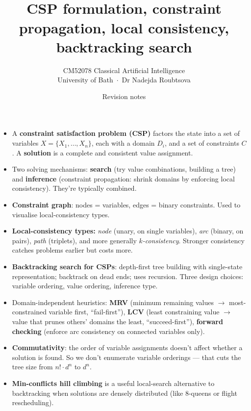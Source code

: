 \documentclass[11pt, a4paper]{article}
\title{\vspace{-1cm}{\Huge\bfseries Week 4 — Constraint Satisfaction Problems} \\[0.4em]{\large CSP formulation, constraint propagation, local consistency, backtracking search}}
\author{\large CM52078 Classical Artificial Intelligence \\[0.2em]\normalsize University of Bath \,$\cdot$\, Dr Nadejda Roubtsova}
\date{Revision notes}
\begin{document}
\maketitle
\thispagestyle{empty}

\vspace{1em}

\begin{tldrbox}
\begin{itemize}[leftmargin=*]
  \item A \textbf{constraint satisfaction problem (CSP)} factors the state into a set of variables $X = \{X_1, \dots, X_n\}$, each with a domain $D_i$, and a set of constraints $C$. A \textbf{solution} is a complete and consistent value assignment.
  \item Two solving mechanisms: \textbf{search} (try value combinations, building a tree) and \textbf{inference} (constraint propagation: shrink domains by enforcing local consistency). They're typically combined.
  \item \textbf{Constraint graph}: nodes = variables, edges = binary constraints. Used to visualise local-consistency types.
  \item \textbf{Local-consistency types:} \emph{node} (unary, on single variables), \emph{arc} (binary, on pairs), \emph{path} (triplets), and more generally \emph{$k$-consistency}. Stronger consistency catches problems earlier but costs more.
  \item \textbf{Backtracking search for CSPs}: depth-first tree building with single-state representation; backtrack on dead ends; uses recursion. Three design choices: variable ordering, value ordering, inference type.
  \item Domain-independent heuristics: \textbf{MRV} (minimum remaining values $\to$ most-constrained variable first, ``fail-first''), \textbf{LCV} (least constraining value $\to$ value that prunes others' domains the least, ``succeed-first''), \textbf{forward checking} (enforce arc consistency on connected variables only).
  \item \textbf{Commutativity}: the order of variable assignments doesn't affect whether a solution is found. So we don't enumerate variable orderings — that cuts the tree size from $n! \cdot d^n$ to $d^n$.
  \item \textbf{Min-conflicts hill climbing} is a useful local-search alternative to backtracking when solutions are densely distributed (like 8-queens or flight rescheduling).
\end{itemize}
\end{tldrbox}
\end{document}
